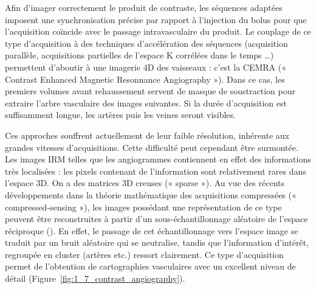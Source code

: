 Afin d’imager correctement le produit de contraste, les séquences adaptées imposent une synchronisation précise par rapport à l’injection du bolus pour que l’acquisition coïncide avec le passage intravasculaire du produit. Le couplage de ce type d’acquisition à des techniques d’accélération des séquences (acquisition parallèle, acquisitions partielles de l’espace K corrélées dans le temps …) permettent d’aboutir à une imagerie 4D des vaisseaux : c’est la CEMRA (« Contrast Enhanced Magnetic Resonnance Angiography »). Dans ce cas, les premiers volumes avant rehaussement servent de masque de soustraction pour extraire l’arbre vasculaire des images suivantes. Si la durée d’acquisition est suffisamment longue, les artères puis les veines seront visibles.

Ces approches souffrent actuellement de leur faible résolution, inhérente aux grandes vitesses d’acquisitions. Cette difficulté peut cependant être surmontée. Les images IRM telles que les angiogrammes contiennent en effet des informations très localisées : les pixels contenant de l’information sont relativement rares dans l’espace 3D. On a des matrices 3D creuses (« sparse »). Au vue des récents développements dans la théorie mathématique des acquisitions compressées (« compressed-sensing »), les images possédant une représentation de ce type peuvent être reconstruites à partir d’un sous-échantillonnage aléatoire de l’espace réciproque (\cite{Lustig2007}). En effet, le passage de cet échantillonnage vers l’espace image se traduit par un bruit aléatoire qui se neutralise, tandis que l’information d’intérêt, regroupée en cluster (artères etc.) ressort clairement. Ce type d’acquisition permet de l’obtention de cartographies vasculaires avec un excellent niveau de détail (Figure~\ref{fig:1_7_contrast_angiography}).


